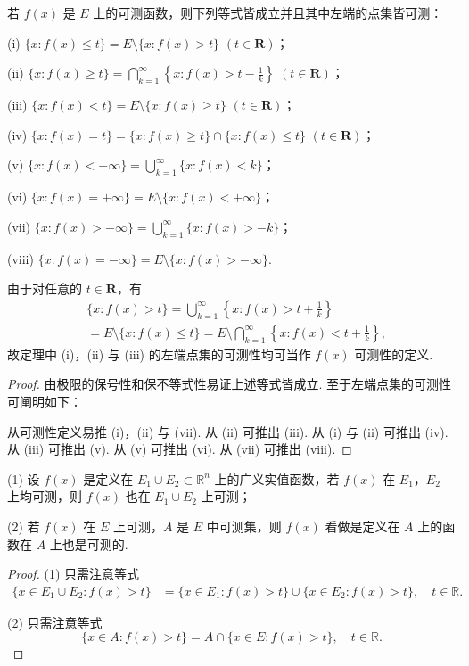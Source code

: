 \documentclass[../../main.tex]{subfiles}
\begin{document}
\begin{theorem}\label{theorem:定理3.2}
若 \(f(x)\) 是 \(E\) 上的可测函数，则下列等式皆成立并且其中左端的点集皆可测：

(i) \(\{x: f(x) \leqslant t\} = E \setminus \{x: f(x) > t\}\) \((t \in \mathbf{R})\)；

(ii) \(\{x: f(x) \geqslant t\} = \bigcap_{k = 1}^{\infty}\left\{x: f(x) > t - \frac{1}{k}\right\}\) \((t \in \mathbf{R})\)；

(iii) \(\{x: f(x) < t\} = E \setminus \{x: f(x) \geqslant t\}\) \((t \in \mathbf{R})\)；

(iv) \(\{x: f(x) = t\} = \{x: f(x) \geqslant t\} \cap \{x: f(x) \leqslant t\}\) \((t \in \mathbf{R})\)；

(v) \(\{x: f(x) < +\infty\} = \bigcup_{k = 1}^{\infty}\{x: f(x) < k\}\)；

(vi) \(\{x: f(x) = +\infty\} = E \setminus \{x: f(x) < +\infty\}\)；

(vii) \(\{x: f(x) > -\infty\} = \bigcup_{k = 1}^{\infty}\{x: f(x) > -k\}\)；

(viii) \(\{x: f(x) = -\infty\} = E \setminus \{x: f(x) > -\infty\}\).
\end{theorem}
\begin{remark}
由于对任意的 \(t \in \mathbf{R}\)，有
\begin{align*}
&\{x: f(x) > t\} = \bigcup_{k = 1}^{\infty}\left\{x: f(x) > t + \frac{1}{k}\right\}\\
&= E \setminus \{x: f(x) \leqslant t\} = E \setminus \bigcap_{k = 1}^{\infty}\left\{x: f(x) < t + \frac{1}{k}\right\},
\end{align*}
故定理中 (i)，(ii) 与 (iii) 的左端点集的可测性均可当作 \(f(x)\) 可测性的定义. 
\end{remark}
\begin{proof}
由极限的保号性和保不等式性易证上述等式皆成立. 至于左端点集的可测性可阐明如下：

从可测性定义易推 (i)，(ii) 与 (vii). 从 (ii) 可推出 (iii). 从 (i) 与 (ii) 可推出 (iv). 从 (iii) 可推出 (v). 从 (v) 可推出 (vi). 从 (vii) 可推出 (viii). 
\end{proof}

\begin{theorem}\label{theorem:定理3.3}
(1) 设 \(f(x)\) 是定义在 \(E_1\cup E_2 \subset \mathbb{R}^n\) 上的广义实值函数，若 \(f(x)\) 在 \(E_1\)，\(E_2\) 上均可测，则 \(f(x)\) 也在 \(E_1\cup E_2\) 上可测；

(2) 若 \(f(x)\) 在 \(E\) 上可测，\(A\) 是 \(E\) 中可测集，则 \(f(x)\) 看做是定义在 \(A\) 上的函数在 \(A\) 上也是可测的.
\end{theorem}
\begin{proof}
(1) 只需注意等式
\begin{align*}
\{x \in E_1\cup E_2: f(x) > t\} 
&= \{x \in E_1: f(x) > t\} \cup \{x \in E_2: f(x) > t\}, \quad t \in \mathbb{R}.
\end{align*}

(2) 只需注意等式
\[
\{x \in A: f(x) > t\} = A \cap \{x \in E: f(x) > t\}, \quad t \in \mathbb{R}.
\]
\end{proof}
\end{document}
